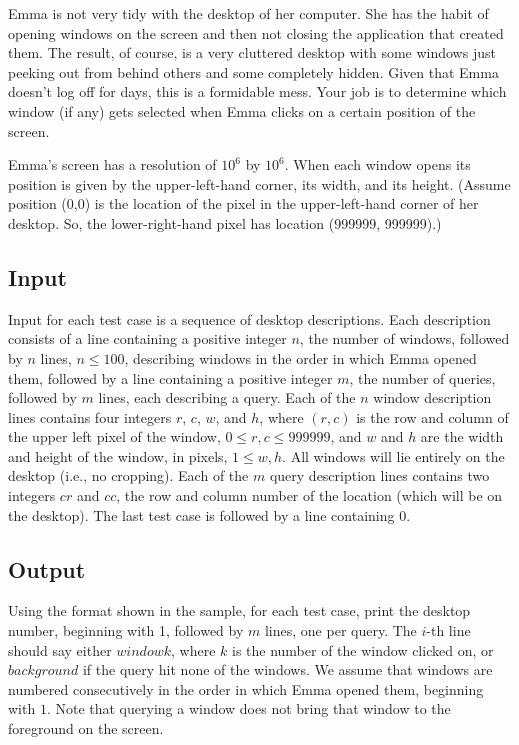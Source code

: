 Emma is not very tidy with the desktop of her computer. She has the habit of
opening windows on the screen and then not closing the application that
created them. The result, of course, is a very cluttered desktop with some
windows just peeking out from behind others and some completely hidden.
Given that Emma doesn't log off for days, this is a formidable mess. Your
job is to determine which window (if any) gets selected when Emma clicks on
a certain position of the screen.

Emma's screen has a resolution of $10^6$ by $10^6$. When each window opens
its position is given by the upper-left-hand corner, its width, and its
height. (Assume position (0,0) is the location of the pixel in the
upper-left-hand  corner of her desktop. So, the lower-right-hand pixel has
location (999999,  999999).)

\subsection*{Input}

Input for each test case is a sequence of desktop descriptions. Each
description consists of a line containing a positive integer $n$, the number
of windows, followed by $n$ lines, $n \leq 100$, describing windows in the
order in which Emma opened them, followed by a line containing a positive
integer $m$, the number of queries, followed by $m$ lines, each describing a
query. Each of the $n$ window description lines contains four integers $r$,
$c$, $w$, and $h$, where $(r, c)$ is the row and column of the upper left
pixel of the window, $0 \leq r, c \leq 999999$, and $w$ and $h$ are the
width and height of the window, in pixels, $1 \leq w, h$. All windows will
lie entirely on the desktop (i.e., no cropping). Each of the $m$ query
description lines contains two integers $cr$ and $cc$, the row and column
number of the location (which will be on the desktop). The last test case is
followed by a line containing $0$.

\subsection*{Output}

Using the format shown in the sample, for each test case, print the desktop
number, beginning with 1, followed by $m$ lines, one per query. The $i$-th
line should say either $window k$, where $k$ is the number of the window
clicked on, or $background$ if the query hit none of the windows. We assume
that windows are numbered consecutively in the order in which Emma opened
them, beginning with $1$. Note that querying a window does not bring that
window to the foreground on the screen.

